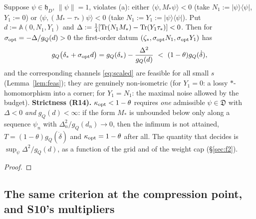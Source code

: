 \documentclass[11pt]{article}
\newcommand{\hh}{\mathfrak h}
\newcommand{\Aop}{\mathbb A}
\begin{document}
\begin{corollary}\label{cor:better}
Suppose $\psi\in\hh_D$, $\|\psi\|=1$, violates {\rm(a)}: either
$\langle\psi,M_*\psi\rangle<0$ (take $N_1:=|\psi\rangle\langle\psi|$, $Y_1:=0$) or
$\langle\psi,(M_*-\tau_*)\psi\rangle<0$ (take $N_1:=Y_1:=|\psi\rangle\langle\psi|$).  Put
$d:=\Aop(0,N_1,Y_1)$ and $\Delta:=\frac14[\operatorname{Tr}(N_1M_*)-\operatorname{Tr}(Y_1\tau_*)]<0$.  Then for
$\sigma_{\rm opt}=-\Delta/g_Q(d)>0$ the first-order datum $(\zeta_*,\sigma_{\rm opt}N_1,
\sigma_{\rm opt}Y_1)$ has
\begin{equation}\label{eq:gain2}
 g_Q\bigl(\delta_*+\sigma_{\rm opt}d\bigr)=g_Q(\delta_*)-\frac{\Delta^2}{g_Q(d)}
 \ <\ (1-\theta)g_Q(\dot\delta),
\end{equation}
and the corresponding channels \eqref{eq:scaled} are feasible for all small $s$
(Lemma~\ref{lem:feas}); they are genuinely non-isometric (for $Y_1=0$: a lossy
$*$-homomorphism into a corner; for $Y_1=N_1$: the maximal noise allowed by the budget).
\textbf{Strictness (R14).}  $\kappa_{\rm opt}<1-\theta$ requires \emph{one} admissible
$\psi\in\mathfrak D$ with $\Delta<0$ \emph{and} $g_Q(d)<\infty$: if the form $M_*$ is
unbounded below only along a sequence $\psi_n$ with $\Delta_n^2/g_Q(d_n)\to0$, then the
infimum is not attained, $T=(1-\theta)g_Q(\dot\delta)$ and $\kappa_{\rm opt}=1-\theta$
after all.  The quantity that decides is $\sup_\psi\Delta^2/g_Q(d)$, as a function of the
grid and of the weight cap (\S\ref{sec:f2}).
\end{corollary}
\begin{proof}
\end{proof}


\subsection{The same criterion at the compression point, and S10's multipliers}\label{sec:s10cmp}
\end{document}
